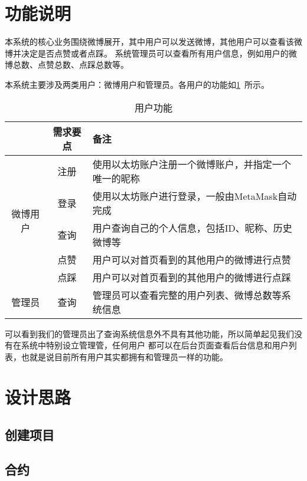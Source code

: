 \documentclass[bwprint]{hfutreport}
\begin{document}
\section{功能说明}
本系统的核心业务围绕微博展开，其中用户可以发送微博，其他用户可以查看该微博并决定是否点赞或者点踩。
系统管理员可以查看所有用户信息，例如用户的微博总数、点赞总数、点踩总数等。

本系统主要涉及两类用户：微博用户和管理员。各用户的功能如\cref{tab:func}~所示。
\begin{table}[!htbp]
    \caption{用户功能}\label{tab:func}
    \centering
    \begin{tabular}{ccl}
        \hline
        \textbf{}                 & \textbf{需求要点} & \textbf{备注}                                        \\ \hline
        \multirow{5}{*}{微博用户} & 注册              & 使用以太坊账户注册一个微博账户，并指定一个唯一的昵称 \\
                                  & 登录              & 使用以太坊账户进行登录，一般由MetaMask自动完成       \\
                                  & 查询              & 用户查询自己的个人信息，包括ID、昵称、历史微博等     \\
                                  & 点赞              & 用户可以对首页看到的其他用户的微博进行点赞           \\
                                  & 点踩              & 用户可以对首页看到的其他用户的微博进行点踩           \\ \hline
        管理员                    & 查询              & 管理员可以查看完整的用户列表、微博总数等系统信息     \\ \hline
    \end{tabular}
\end{table}

可以看到我们的管理员出了查询系统信息外不具有其他功能，所以简单起见我们没有在系统中特别设立管理管，任何用户
都可以在后台页面查看后台信息和用户列表，也就是说目前所有用户其实都拥有和管理员一样的功能。

\section{设计思路}
\subsection{创建项目}
\subsection{合约}
\end{document}
